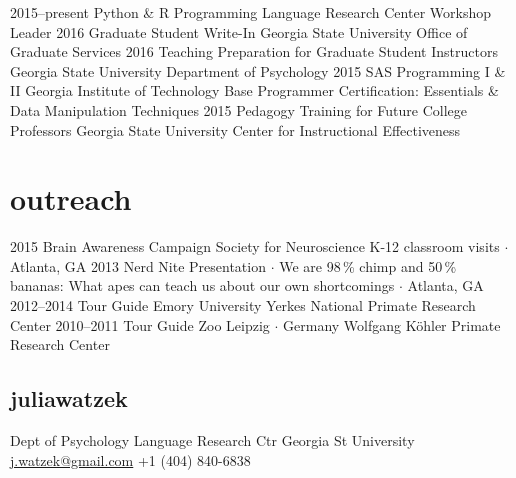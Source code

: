 \documentclass[]{friggeri-cv}
\begin{document}
\begin{entrylist}
  \entry
    {2015--present}
    {Python \& R Programming}
    {Language Research Center}
    {Workshop Leader} %
  \entry
    {2016}
    {Graduate Student Write-In}
    {Georgia State University}
    {Office of Graduate Services}
  \entry
    {2016}
    {Teaching Preparation for Graduate Student Instructors}
    {Georgia State University}
    {Department of Psychology}
  \entry
    {2015}
    {SAS Programming I \& II}
    {Georgia Institute of Technology}
    {Base Programmer Certification: Essentials \& Data Manipulation Techniques}
  \entry
    {2015}
    {Pedagogy Training for Future College Professors}
    {Georgia State University}
    {Center for Instructional Effectiveness}
\end{entrylist}


\section{outreach}

\begin{entrylist}
  \entry
    {2015}
    {Brain Awareness Campaign}
    {Society for Neuroscience}
    {K-12 classroom visits $\cdot$ Atlanta, GA}
  \entry
    {2013}
    {Nerd Nite}
    {}
    {Presentation $\cdot$ We are 98\,\% chimp and 50\,\% bananas: What apes can teach us about our own shortcomings $\cdot$ Atlanta, GA}
  \entry
    {2012--2014}
    {Tour Guide}
    {Emory University}
    {Yerkes National Primate Research Center}
  \entry
    {2010--2011}
    {Tour Guide}
    {Zoo Leipzig $\cdot$ Germany}
    {Wolfgang K\"{o}hler Primate Research Center}
\end{entrylist}

\begin{aside}
  \section{{\normalfont julia}watzek}
    Dept of Psychology
    Language Research Ctr
    Georgia St University
    ~
    \href{mailto:j.watzek@gmail.com}{j.watzek@gmail.com}
    +1 (404) 840-6838
\end{aside}
\end{document}
